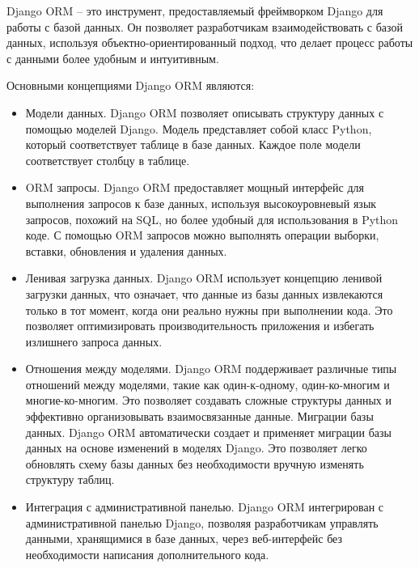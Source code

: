 
Django ORM -- это инструмент, предоставляемый фреймворком Django для работы с базой данных.
Он позволяет разработчикам взаимодействовать с базой данных, используя объектно-ориентированный подход,
что делает процесс работы с данными более удобным и интуитивным.

Основными концепциями Django ORM являются:
\begin{itemize}
    \item Модели данных.
    Django ORM позволяет описывать структуру данных с помощью моделей Django.
    Модель представляет собой класс Python, который соответствует таблице в базе данных.
    Каждое поле модели соответствует столбцу в таблице.
    \item ORM запросы.
    Django ORM предоставляет мощный интерфейс для выполнения запросов к базе данных, используя высокоуровневый язык запросов, похожий на SQL,
    но более удобный для использования в Python коде.
    С помощью ORM запросов можно выполнять операции выборки, вставки, обновления и удаления данных.
    \item Ленивая загрузка данных.
    Django ORM использует концепцию ленивой загрузки данных, что означает,
    что данные из базы данных извлекаются только в тот момент, когда они реально нужны при выполнении кода.
    Это позволяет оптимизировать производительность приложения и избегать излишнего запроса данных.
    \item Отношения между моделями.
    Django ORM поддерживает различные типы отношений между моделями,
    такие как один-к-одному, один-ко-многим и многие-ко-многим.
    Это позволяет создавать сложные структуры данных и эффективно организовывать взаимосвязанные данные.
    Миграции базы данных.
    Django ORM автоматически создает и применяет миграции базы данных на основе изменений в моделях Django.
    Это позволяет легко обновлять схему базы данных без необходимости вручную изменять структуру таблиц.
    \item Интеграция с административной панелью.
    Django ORM интегрирован с административной панелью Django, позволяя разработчикам управлять данными, хранящимися в базе данных, через веб-интерфейс без необходимости написания дополнительного кода.
\end{itemize}


